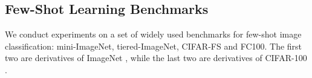 \documentclass{article}
\begin{document}
\subsection{Few-Shot Learning Benchmarks}\label{sec:exp:few-shot}
We conduct experiments on a set of widely used benchmarks for few-shot image classification: mini-ImageNet, tiered-ImageNet, CIFAR-FS and FC100. The first two are derivatives of ImageNet \cite{imagenet}, while the last two are derivatives of CIFAR-100 \cite{cifar}.
\begin{table*}[ht!]

    \caption{
    \textbf{Comparison on four few-shot image classification benchmarks.} Average few-shot test classification accuracy (\%) with 95\% confidence intervals. 32-32-32-32 denotes a 4-layer convolutional neural net with 32 filters in each layer. In each column, \textbf{bold} values are the highest accuracy, or the accuracy no less than $1\%$ compared with the highest one. \\}
    \vspace{-10pt}
    \label{tab:benchmark}
    \vspace{-5pt}
    \begin{center}
\end{center}
\end{table*}
\end{document}
